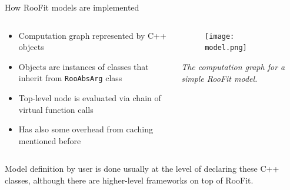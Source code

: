\documentclass[aspectratio=169]{beamer}
\begin{document}
\begin{frame}{How RooFit models are implemented}
\begin{columns}
\begin{column}{0.5\textwidth}
    \begin{itemize}
        \item Computation graph represented by C++ objects
        \item Objects are instances of classes that inherit from \texttt{RooAbsArg} class
        \item Top-level node is evaluated via chain of virtual function calls
        \item Has also some overhead from caching mentioned before
    \end{itemize}
\end{column}
\begin{column}{0.5\textwidth}
    \begin{figure}
        \texttt{[image: model.png]}
    \end{figure}
    \textit{\footnotesize The computation graph for a simple RooFit model.}
\end{column}
\end{columns}
    \vspace{0.5cm}
    Model definition by user is done usually at the level of declaring these C++ classes, although there are higher-level frameworks on top of RooFit.
\end{frame}
\end{document}
